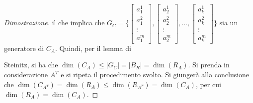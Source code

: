 \documentclass{article}
\begin{document}
\begin{proof}[Dimostrazione]
        il che implica che 
        $G_C = \{
            \begin{bmatrix}
                a_{1}^{1} \\
                a_{1}^{2} \\
                \vdots \\
                a_{1}^{m}
            \end{bmatrix},  
            \begin{bmatrix}
                a_{2}^{1} \\
                a_{2}^{2} \\
                \vdots \\
                a_{2}^{m}
            \end{bmatrix},
            ...,
            \begin{bmatrix}
                a_{k}^{1} \\
                a_{k}^{2} \\
                \vdots \\
                a_{k}^{m}
            \end{bmatrix} 
            \}$
        sia un generatore di $C_A$. Quindi, per il lemma di 

        \vspace{5pt}
        Steinitz, si ha che $\dim(C_A) \leq |G_C| = |B_R| = \dim(R_A)$. Si prenda in considerazione $A^T$ e si ripeta il procedimento svolto.
        Si giungerà alla conclusione che $\dim(C_{A^T}) = \dim(R_A) \leq \dim(R_{A^T}) = \dim(C_A)$, per cui $\dim(R_A) = \dim(C_A)$.
    \end{proof}

\vspace{10pt}
\end{document}
